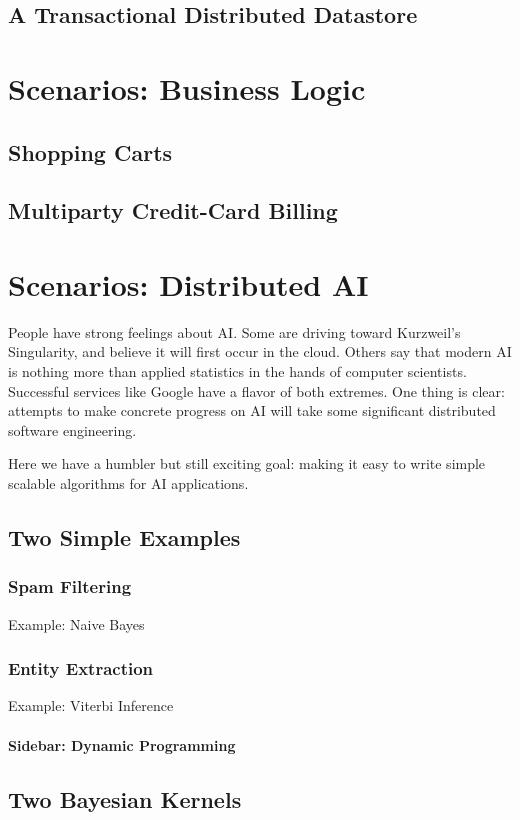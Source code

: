 \documentclass[]{book}
\begin{document}
    \section{A Transactional Distributed Datastore}

\chapter{Scenarios: Business Logic}
    \section{Shopping Carts}
    \section{Multiparty Credit-Card Billing}
    
\chapter{Scenarios: Distributed AI}
People have strong feelings about AI.  Some are driving toward Kurzweil's Singularity, and believe it will first occur in the cloud.  Others say that modern AI is nothing more than applied statistics in the hands of computer scientists.  Successful services like Google have a flavor of both extremes.  One thing is clear: attempts to make concrete progress on AI will take some significant distributed software engineering.

Here we have a humbler but still exciting goal: making it easy to write simple scalable algorithms for AI applications.

    \section{Two Simple Examples}
        \subsection{Spam Filtering}
        Example: Naive Bayes
        \subsection{Entity Extraction}
        Example: Viterbi Inference
        \subsubsection{Sidebar: Dynamic Programming}
    \section{Two Bayesian Kernels}
\end{document}
